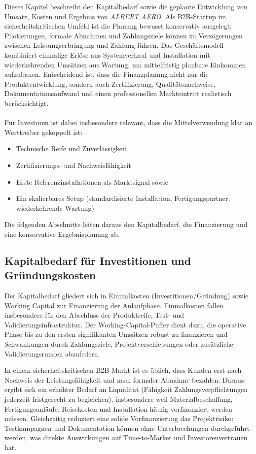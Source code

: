 \documentclass[11pt,a4paper]{article}
\begin{document}
Dieses Kapitel beschreibt den Kapitalbedarf sowie die geplante Entwicklung von Umsatz, Kosten und Ergebnis von \textit{ALBERT AERO}. Als B2B-Startup im sicherheitskritischen Umfeld ist die Planung bewusst konservativ ausgelegt: Pilotierungen, formale Abnahmen und Zahlungsziele können zu Verzögerungen zwischen Leistungserbringung und Zahlung führen. Das Geschäftsmodell kombiniert einmalige Erlöse aus Systemverkauf und Installation mit wiederkehrenden Umsätzen aus Wartung, um mittelfristig planbare Einkommen aufzubauen. Entscheidend ist, dass die Finanzplanung nicht nur die Produktentwicklung, sondern auch Zertifizierung, Qualitätsnachweise, Dokumentationsaufwand und einen professionellen Markteintritt realistisch berücksichtigt. \\
\\ Für Investoren ist dabei insbesondere relevant, dass die Mittelverwendung klar an Werttreiber gekoppelt ist:
\begin{itemize}
    \item Technische Reife und Zuverlässigkeit 
    \item Zertifizierungs- und Nachweisfähigkeit
    \item Erste Referenzinstallationen als Marktsignal sowie
    \item Ein skalierbares Setup (standardisierte Installation, Fertigungspartner, wiederkehrende Wartung)
\end{itemize}
Die folgenden Abschnitte leiten daraus den Kapitalbedarf, die Finanzierung und eine konservative Ergebnisplanung ab.

\subsection{Kapitalbedarf für Investitionen und Gründungskosten}
Der Kapitalbedarf gliedert sich in Einmalkosten (Investitionen/Gründung) sowie Working Capital zur Finanzierung der Anlaufphase. Einmalkosten fallen insbesondere für den Abschluss der Produktreife, Test- und Validierungsinfrastruktur. Der Working-Capital-Puffer dient dazu, die operative Phase bis zu den ersten signifikanten Umsätzen robust zu finanzieren und Schwankungen durch Zahlungsziele, Projektverschiebungen oder zusätzliche Validierungsrunden abzufedern.

In einem sicherheitskritischen B2B-Markt ist es üblich, dass Kunden erst nach Nachweis der Leistungsfähigkeit und nach formaler Abnahme bezahlen. Daraus ergibt sich ein erhöhter Bedarf an Liquidität (Fähigkeit Zahlungsverpflichtungen jederzeit fristgerecht zu begleichen), insbesondere weil Materialbeschaffung, Fertigungsanläufe, Reisekosten und Installation häufig vorfinanziert werden müssen. Gleichzeitig reduziert eine solide Vorfinanzierung das Projektrisiko: Testkampagnen und Dokumentation können ohne Unterbrechungen durchgeführt werden, was direkte Auswirkungen auf Time-to-Market und Investorenvertrauen hat.
\end{document}
